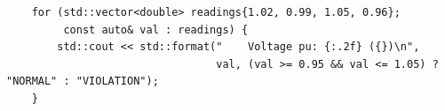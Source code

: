 \begin{verbatim}
    for (std::vector<double> readings{1.02, 0.99, 1.05, 0.96}; 
         const auto& val : readings) {
        std::cout << std::format("    Voltage pu: {:.2f} ({})\n", 
                                 val, (val >= 0.95 && val <= 1.05) ? "NORMAL" : "VIOLATION");
    }
\end{verbatim}
